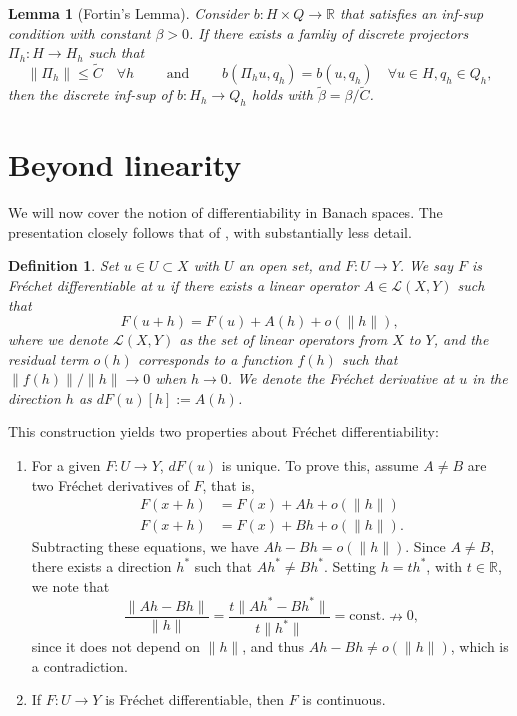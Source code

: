 \documentclass{article}
\newtheorem{definition}{Definition}
\newcommand{\R}{\mathbb{R}}
\newtheorem{lemma}{Lemma}
\begin{document}
\begin{lemma}[Fortin's Lemma]
Consider $b:H\times Q\to \R$ that satisfies an inf-sup condition with constant $\beta >0$. If there exists a famliy of discrete projectors $\Pi_h: H\to H_h$ such that 
    \[ \|\Pi_h \|\leq \tilde C \quad \forall h \qquad \text{ and } \qquad b(\Pi_h u, q_h) = b(u, q_h) \quad\forall u\in H, q_h \in Q_h,\]
then the discrete inf-sup of $b:H_h\to Q_h$ holds with $\tilde \beta = \beta / \tilde C$.
\end{lemma}

\section{Beyond linearity}\label{sec:nonlinear}
We will now cover the notion of differentiability in Banach spaces. The presentation closely follows that of \cite{ambrosetti1995primer}, with substantially less detail.
\begin{definition}
    Set $u\in U \subset X$ with $U$ an open set, and $F:U\to Y$. We say $F$ is Fréchet differentiable at $u$ if there exists a linear operator $A\in\mathcal{L}(X,Y)$ such that
    \begin{equation*}
        F(u+h)=F(u)+A(h)+o(\|h\|),
    \end{equation*}
    where we denote $\mathcal{L}(X,Y)$ as the set of linear operators from $X$ to $Y$, and the residual term $o(h)$ corresponds to a function $f(h)$ such that $\|f(h)\|/\|h\| \to 0$ when $h\to 0$. We denote the Fréchet derivative at $u$ in the direction $h$ as $dF(u)[h] := A(h)$.
\end{definition}
This construction yields two properties about Fréchet differentiability:
\begin{enumerate}
    \item For a given $F:U\to Y$, $dF(u)$ is unique. To prove this, assume $A\neq B$ are two Fréchet derivatives of $F$, that is, 
    \begin{align*}
        F(x+h) &= F(x) + Ah + o(\|h\|) \\
        F(x+h) &= F(x) + Bh + o(\|h\|).
    \end{align*}
    Subtracting these equations, we have $Ah - Bh = o(\|h\|)$. Since $A\neq B$, there exists a direction $h^*$ such that $Ah^* \neq Bh^*$. Setting $h=th^*$, with $t\in \mathbb{R}$, we note that
    \begin{equation*}
        \frac{\|Ah-Bh\|}{\|h\|} = \frac{t\|Ah^*-Bh^*\|}{t\|h^*\|} = \text{const.} \nrightarrow 0,
    \end{equation*}
    since it does not depend on $\|h\|$, and thus $Ah - Bh \neq o(\|h\|)$, which is a contradiction. 
    \item If $F:U\to Y$ is Fréchet differentiable, then $F$ is continuous.
\end{enumerate}
\end{document}
